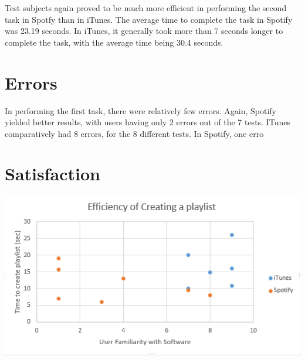 \documentclass[12pt]{report}
\begin{document}
Test subjects again proved to be much more efficient in performing the second task in Spotfy than in iTunes. The average time to complete the task in Spotify was 23.19 seconds. In iTunes, it generally took more than 7 seconds longer to complete the task, with the average time being 30.4 seconds.

\section{Errors}

In performing the first task, there were relatively few errors. Again, Spotify yielded better results, with users having only 2 errors out of the 7 tests. ITunes comparatively had 8 errors, for the 8 different tests. In Spotify, one erro

\section{Satisfaction}

\includegraphics[width=\textwidth]{chart1.png}
\end{document}
